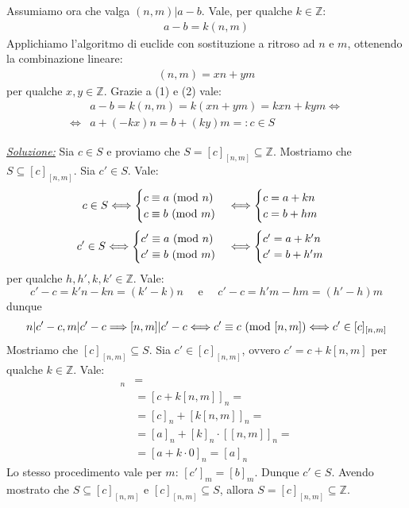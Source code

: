 \documentclass[oneside]{book}
\begin{document}
\begin{tcolorbox}[enhanced, breakable, title={Teolema cinese del lesto}]
Assumiamo ora che valga $(n,m)|a-b$. Vale, per qualche $k \in \mathbb{Z}$:
\begin{align}
    a-b = k(n,m)
\end{align}
Applichiamo l'algoritmo di euclide con sostituzione a ritroso ad $n$ e $m$, ottenendo la
combinazione lineare:
\begin{align}
    (n,m) = xn+ym
\end{align}
per qualche $x,y \in \mathbb{Z}$. Grazie a (1) e (2) vale:
\begin{align*}
    &a-b=k(n,m)=k(xn+ym)=kxn+kym \Leftrightarrow\\
    \Leftrightarrow &a+(-kx)n=b+(ky)m =: c \in S
\end{align*}

\underline{\emph{Soluzione:}} Sia $c \in S$ e proviamo che $S=[c]_{[n,m]} \subseteq \mathbb{Z}$.
Mostriamo che $S \subseteq [c]_{[n,m]}$. Sia $c'\in S$. Vale:
\[ c \in S \Longleftrightarrow
    \begin{cases}
        c \equiv a \ (\mathrm{mod}\ n)\\
        c \equiv b \ (\mathrm{mod}\ m)
    \end{cases}
    \Longleftrightarrow
    \begin{cases}
        c = a+kn\\
        c = b+hm
    \end{cases}
\]
\[
    c' \in S \Longleftrightarrow
    \begin{cases}
        c' \equiv a \ (\mathrm{mod}\ n)\\
        c' \equiv b \ (\mathrm{mod}\ m)
    \end{cases}
    \Longleftrightarrow
    \begin{cases}
        c' = a+k'n\\
        c' = b+h'm
    \end{cases}
\]
per qualche $h,h',k,k' \in \mathbb{Z}$. Vale:
\[ c'-c=k'n-kn=(k'-k)n \quad\text{ e }\quad c'-c=h'm-hm=(h'-h)m \]
dunque
\[ n|c'-c,m|c'-c \Longrightarrow [n,m]|c'-c \Longleftrightarrow c'\equiv c \ (\mathrm{mod}\ [n,m]) \Longleftrightarrow c' \in [c]_{[n,m]} \]
Mostriamo che $[c]_{[n,m]} \subseteq S$. Sia $c' \in [c]_{[n,m]}$, ovvero $c'=c+k[n,m]$ per qualche
$k \in \mathbb{Z}$. Vale:
\begin{align*}
    [c']_n &=\\
    &= [c+k[n,m]]_n =\\
    &= [c]_n + [k[n,m]]_n =\\
    &= [a]_n + [k]_n \cdot [[n,m]]_n =\\
    &= [a+k\cdot 0]_n = [a]_n
\end{align*}
Lo stesso procedimento vale per $m$: $[c']_m = [b]_m$. Dunque $c'\in S$.
Avendo mostrato che $S\subseteq[c]_{[n,m]}$ e $[c]_{[n,m]}\subseteq S$,
allora $S = [c]_{[n,m]}\subseteq\mathbb{Z}$.
\cvd
\end{tcolorbox}
\end{document}
